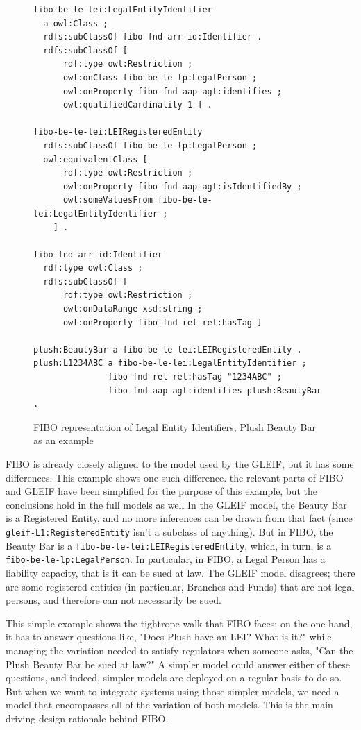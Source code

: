 \begin{figure}
\begin{lstlisting}
fibo-be-le-lei:LegalEntityIdentifier
  a owl:Class ;
  rdfs:subClassOf fibo-fnd-arr-id:Identifier .
  rdfs:subClassOf [
      rdf:type owl:Restriction ;
      owl:onClass fibo-be-le-lp:LegalPerson ;
      owl:onProperty fibo-fnd-aap-agt:identifies ;
      owl:qualifiedCardinality 1 ] .
   
fibo-be-le-lei:LEIRegisteredEntity
  rdfs:subClassOf fibo-be-le-lp:LegalPerson ;
  owl:equivalentClass [
      rdf:type owl:Restriction ;
      owl:onProperty fibo-fnd-aap-agt:isIdentifiedBy ;
      owl:someValuesFrom fibo-be-le-lei:LegalEntityIdentifier ;
    ] .
  
fibo-fnd-arr-id:Identifier
  rdf:type owl:Class ;
  rdfs:subClassOf [
      rdf:type owl:Restriction ;
      owl:onDataRange xsd:string ;
      owl:onProperty fibo-fnd-rel-rel:hasTag ] 

plush:BeautyBar a fibo-be-le-lei:LEIRegisteredEntity .
plush:L1234ABC a fibo-be-le-lei:LegalEntityIdentifier ;
               fibo-fnd-rel-rel:hasTag "1234ABC" ;
               fibo-fnd-aap-agt:identifies plush:BeautyBar . 
\end{lstlisting}
    \caption{FIBO representation of Legal Entity Identifiers, Plush Beauty Bar as an example}
    \label{fig:ch14.fibolei}
\end{figure}

FIBO is already closely aligned to the model used by the 
GLEIF, but it has some differences.  This example shows one such difference. {the relevant parts of 
FIBO and GLEIF have been simplified for the purpose of this example, but the conclusions hold in the full 
models as well}
In the GLEIF model, the Beauty Bar is a Registered Entity, and no more inferences can be 
drawn from that fact (since \texttt{gleif-L1:RegisteredEntity} isn't a subclass of anything).  But in FIBO, 
the Beauty Bar is a \texttt{fibo-be-le-lei:LEIRegisteredEntity}, which, in turn, is a 
\texttt{fibo-be-le-lp:LegalPerson}.  In particular, in FIBO, a Legal Person has a liability capacity, that is
it can be sued at law.  The GLEIF model disagrees; there are some registered entities (in particular,
Branches and Funds) that are not legal persons, and therefore can not necessarily be sued.


This simple example shows the tightrope walk that FIBO faces; 
on the one hand, it has to answer questions like, "Does Plush 
have an LEI?  What is it?"
while managing the variation needed to satisfy regulators 
when someone asks, "Can the Plush Beauty Bar be sued at law?"  
A simpler model could answer
either of these questions, and indeed, simpler models are 
deployed on a regular basis to do so.  But when we want to 
integrate systems using those
simpler models, we need a model that encompasses all of the variation
of both models.  This is the main driving design rationale behind FIBO. 

